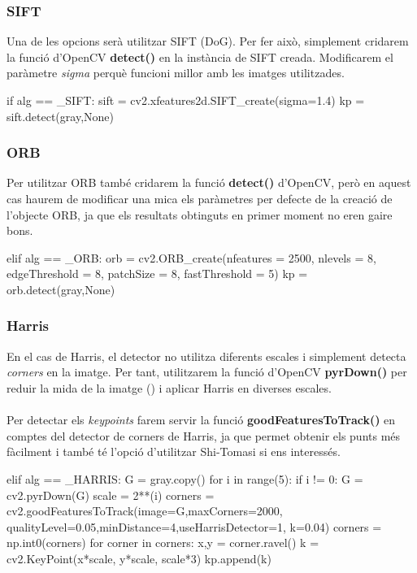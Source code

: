 		\subsubsection{SIFT}
		Una de les opcions serà utilitzar SIFT (DoG). Per fer això, simplement cridarem la funció d'OpenCV \textbf{detect()} en la instància de SIFT creada. Modificarem el paràmetre \textit{sigma} perquè funcioni millor
		amb les imatges utilitzades.\\
		\begin{python}
	if alg == _SIFT:
		sift = cv2.xfeatures2d.SIFT_create(sigma=1.4)
		kp = sift.detect(gray,None)
		\end{python}

		\subsubsection{ORB}
		Per utilitzar ORB també cridarem la funció \textbf{detect()} d'OpenCV, però en aquest cas haurem de modificar una mica els paràmetres per defecte de la creació de l'objecte ORB, ja que els resultats obtinguts
		en primer moment no eren gaire bons.\\
		\begin{python}
	elif alg == _ORB:
		orb = cv2.ORB_create(nfeatures = 2500, nlevels = 8, edgeThreshold = 8,
		 patchSize = 8, fastThreshold = 5)
		kp = orb.detect(gray,None)
		\end{python}
\newpage
		\subsubsection{Harris}
		En el cas de Harris, el detector no utilitza diferents escales i simplement detecta \textit{corners} en la imatge. Per tant, utilitzarem la funció d'OpenCV \textbf{pyrDown()} per reduir
		la mida de la imatge () i aplicar Harris en diverses escales.\\\\
		Per detectar els \textit{keypoints} farem servir la funció \textbf{goodFeaturesToTrack()} en comptes del detector de corners de Harris, ja que permet obtenir els punts més fàcilment i
		també té l'opció d'utilitzar Shi-Tomasi si ens interessés.\\
		\begin{python}
	elif alg == _HARRIS:
		G = gray.copy()
		for i in range(5):
			if i != 0:
				G = cv2.pyrDown(G)
			scale = 2**(i)
			corners = cv2.goodFeaturesToTrack(image=G,maxCorners=2000,
				qualityLevel=0.05,minDistance=4,useHarrisDetector=1, k=0.04)
			corners = np.int0(corners)
			for corner in corners:
				x,y = corner.ravel()
				k = cv2.KeyPoint(x*scale, y*scale, scale*3)
				kp.append(k)
		\end{python}

